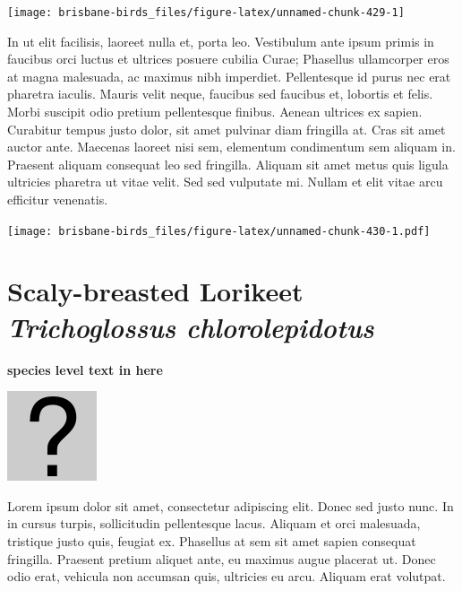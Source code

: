\documentclass[]{book}
\let\origfigure\figure
\let\endorigfigure\endfigure
\renewenvironment{figure}[1][2] {
  \expandafter\origfigure\expandafter[H]
} {
  \endorigfigure
}
\begin{document}
\begin{figure}
\texttt{[image: brisbane-birds\_files/figure-latex/unnamed-chunk-429-1]} \caption{insert figure caption}\label{fig:unnamed-chunk-429}
\end{figure}

In ut elit facilisis, laoreet nulla et, porta leo. Vestibulum ante ipsum
primis in faucibus orci luctus et ultrices posuere cubilia Curae;
Phasellus ullamcorper eros at magna malesuada, ac maximus nibh
imperdiet. Pellentesque id purus nec erat pharetra iaculis. Mauris velit
neque, faucibus sed faucibus et, lobortis et felis. Morbi suscipit odio
pretium pellentesque finibus. Aenean ultrices ex sapien. Curabitur
tempus justo dolor, sit amet pulvinar diam fringilla at. Cras sit amet
auctor ante. Maecenas laoreet nisi sem, elementum condimentum sem
aliquam in. Praesent aliquam consequat leo sed fringilla. Aliquam sit
amet metus quis ligula ultricies pharetra ut vitae velit. Sed sed
vulputate mi. Nullam et elit vitae arcu efficitur venenatis.

\begin{figure}
\centering
\texttt{[image: brisbane-birds\_files/figure-latex/unnamed-chunk-430-1.pdf]}
\caption{\label{fig:unnamed-chunk-430}insert figure caption}
\end{figure}

\section{\texorpdfstring{Scaly-breasted Lorikeet \emph{Trichoglossus
chlorolepidotus}}{Scaly-breasted Lorikeet Trichoglossus chlorolepidotus}}\label{scaly-breasted-lorikeet-trichoglossus-chlorolepidotus}

\textbf{species level text in here}

\begin{figure}
\centering
\includegraphics{assets/missing.png}
\caption{No image for species}
\end{figure}

Lorem ipsum dolor sit amet, consectetur adipiscing elit. Donec sed justo
nunc. In in cursus turpis, sollicitudin pellentesque lacus. Aliquam et
orci malesuada, tristique justo quis, feugiat ex. Phasellus at sem sit
amet sapien consequat fringilla. Praesent pretium aliquet ante, eu
maximus augue placerat ut. Donec odio erat, vehicula non accumsan quis,
ultricies eu arcu. Aliquam erat volutpat.
\end{document}
